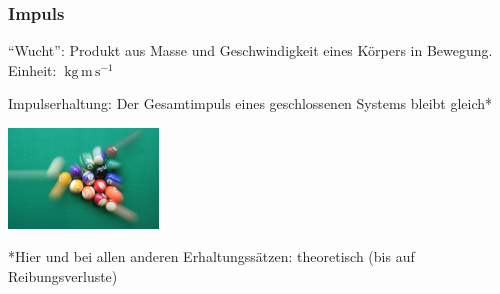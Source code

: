 \documentclass{beamer}
\begin{document}
\begin{frame}
\frametitle{Impuls}

``Wucht'': Produkt aus Masse und Geschwindigkeit eines Körpers in Bewegung. Einheit: \(\
\text{kg}\,\text{m}\,\text{s}^{-1}\)

\pause

Impulserhaltung: Der Gesamtimpuls eines geschlossenen Systems bleibt gleich* 

\begin{center}
\includegraphics[width=0.3\textwidth]{billard.jpg}
\end{center}



 *Hier und bei allen anderen  Erhaltungssätzen: theoretisch (bis auf Reibungsverluste)
\end{frame}
\end{document}
